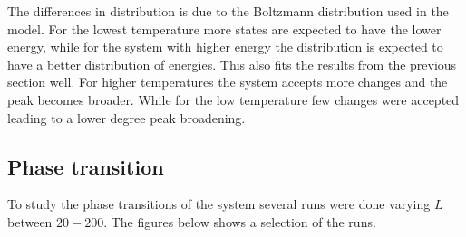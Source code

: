 The differences in distribution is due to the Boltzmann distribution used in the model. For the lowest temperature more states are expected to have the lower energy, while for the system with higher energy the distribution is expected to have a better distribution of energies. This also fits the results from the previous section well. For higher temperatures the system accepts more changes and the peak becomes broader. While for the low temperature few changes were accepted leading to a lower degree peak broadening.




















\subsection{Phase transition}

To study the phase transitions of the system several runs were done varying $L$ between $20-200$. The figures below shows a selection of the runs.


